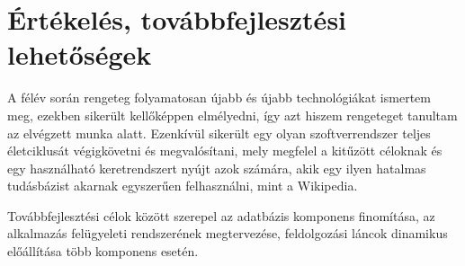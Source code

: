 \chapter{Értékelés, továbbfejlesztési lehetőségek}
\label{cha:ending}

A félév során rengeteg folyamatosan újabb és újabb technológiákat ismertem meg, ezekben sikerült kellőképpen elmélyedni, így azt hiszem rengeteget tanultam az elvégzett munka alatt. Ezenkívül sikerült egy olyan szoftverrendszer teljes életciklusát végigkövetni és megvalósítani, mely megfelel a kitűzött céloknak és egy használható keretrendszert nyújt azok számára, akik egy ilyen hatalmas tudásbázist akarnak egyszerűen felhasználni, mint a Wikipedia.

Továbbfejlesztési célok között szerepel az adatbázis komponens finomítása, az alkalmazás felügyeleti rendszerének megtervezése, feldolgozási láncok dinamikus előállítása több komponens esetén.

